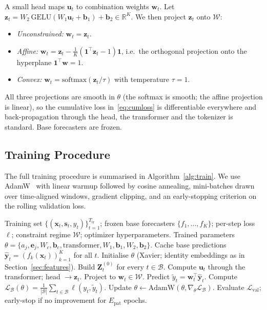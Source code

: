 \documentclass[journal]{IEEEtran}
\begin{document}
A small head maps $\mathbf{u}_t$ to combination weights $\mathbf{w}_t$. Let $\mathbf{z}_t = W_2\,\mathrm{GELU}(W_1 \mathbf{u}_t + \mathbf{b}_1) + \mathbf{b}_2 \in \mathbb{R}^K$. We then project $\mathbf{z}_t$ onto $\mathcal{W}$:
\begin{itemize}
\item \emph{Unconstrained:} $\mathbf{w}_t = \mathbf{z}_t$.
\item \emph{Affine:} $\mathbf{w}_t = \mathbf{z}_t - \tfrac{1}{K}(\mathbf{1}^\top \mathbf{z}_t - 1)\mathbf{1}$, i.e.\ the orthogonal projection onto the hyperplane $\mathbf{1}^\top \mathbf{w}=1$.
\item \emph{Convex:} $\mathbf{w}_t = \mathrm{softmax}(\mathbf{z}_t / \tau)$ with temperature $\tau{=}1$.
\end{itemize}
All three projections are smooth in $\theta$ (the softmax is smooth; the affine projection is linear), so the cumulative loss in~\eqref{eq:cumloss} is differentiable everywhere and back-propagation through the head, the transformer and the tokenizer is standard. Base forecasters are frozen.

\subsection{Training Procedure}

The full training procedure is summarised in Algorithm~\ref{alg:train}. We use AdamW~\cite{loshchilov2019adamw} with linear warmup followed by cosine annealing, mini-batches drawn over time-aligned windows, gradient clipping, and an early-stopping criterion on the rolling validation loss.

\begin{algorithm}[t]
\caption{Offline Training of TAFS}
\label{alg:train}
\begin{algorithmic}[1]
\Require Training set $\{(\mathbf{x}_t,\mathbf{s}_t,y_t)\}_{t=1}^{T_{\mathrm{tr}}}$; frozen base forecasters $\{f_1,\dots,f_K\}$; per-step loss $\ell$; constraint regime $\mathcal{W}$; optimizer hyperparameters.
\Ensure Trained parameters $\theta = \{a_j,\mathbf{e}_j,W_c,\mathbf{b}_c, \text{transformer}, W_1,\mathbf{b}_1,W_2,\mathbf{b}_2\}$.
\State Cache base predictions $\boldsymbol{\hat{y}}_t = (f_k(\mathbf{x}_t))_{k=1}^K$ for all $t$.
\State Initialise $\theta$ (Xavier; identity embeddings as in Section~\ref{sec:features}).
    \State Build $\mathbf{Z}_t^{(0)}$ for every $t\in\mathcal{B}$.
    \State Compute $\mathbf{u}_t$ through the transformer; head $\to \mathbf{z}_t$.
    \State Project to $\mathbf{w}_t \in \mathcal{W}$.
    \State Predict $\tilde{y}_t = \mathbf{w}_t^\top \boldsymbol{\hat{y}}_t$.
    \State Compute $\mathcal{L}_\mathcal{B}(\theta) = \frac{1}{|\mathcal{B}|}\sum_{t\in\mathcal{B}} \ell(y_t,\tilde{y}_t)$.
    \State Update $\theta \leftarrow \mathrm{AdamW}(\theta, \nabla_\theta \mathcal{L}_\mathcal{B})$.
  \EndFor
  \State Evaluate $\mathcal{L}_{\mathrm{val}}$; early-stop if no improvement for $E_{\mathrm{pat}}$ epochs.
\EndFor
\end{algorithmic}
\end{algorithm}
\end{document}
